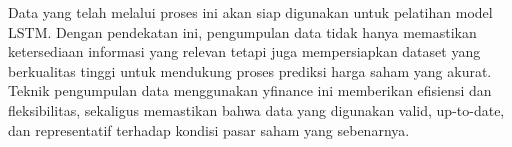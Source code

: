 Data yang telah melalui proses ini akan siap digunakan untuk pelatihan model LSTM. Dengan pendekatan ini, pengumpulan data tidak hanya memastikan ketersediaan informasi yang relevan tetapi juga mempersiapkan dataset yang berkualitas tinggi untuk mendukung proses prediksi harga saham yang akurat. Teknik pengumpulan data menggunakan yfinance ini memberikan efisiensi dan fleksibilitas, sekaligus memastikan bahwa data yang digunakan valid, up-to-date, dan representatif terhadap kondisi pasar saham yang sebenarnya.

